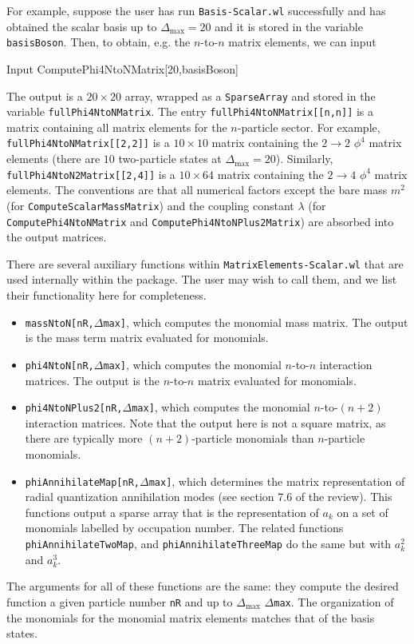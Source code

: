\documentclass[12pt]{article}
\newcommand\De\Delta
\newcommand{\ra}{\rightarrow}
\newcommand{\Dmax}{\De_{\max}}
\begin{document}
For example, suppose the user has run {\tt Basis-Scalar.wl} successfully and has obtained the scalar basis up to $\Delta_{\textrm{max}} = 20$ and it is stored in the variable {\tt basisBoson}. Then, to obtain, e.g. the $n$-to-$n$ matrix elements, we can input \begin{mmaCell}[moredefined={ComputePhi4NtoNMatrix,basisBoson}]{Input}
  ComputePhi4NtoNMatrix[20,basisBoson]
\end{mmaCell}
The output is a $20 \times 20$ array, wrapped as a {\tt SparseArray} and stored in the variable {\tt fullPhi4NtoNMatrix}. The entry {\tt fullPhi4NtoNMatrix[[n,n]]} is a matrix containing all matrix elements for the $n$-particle sector. For example, {\tt fullPhi4NtoNMatrix[[2,2]]} is a $10 \times 10$ matrix containing the $2 \ra 2$ $\phi^4$ matrix elements (there are $10$ two-particle states at $\Dmax=20$). Similarly, {\tt fullPhi4NtoN2Matrix[[2,4]]} is a $10 \times 64$ matrix containing the $2 \ra 4$ $\phi^4$ matrix elements.  The conventions are that all numerical factors except the bare mass $m^2$ (for {\tt ComputeScalarMassMatrix}) and the coupling constant $\lambda$ (for {\tt ComputePhi4NtoNMatrix} and {\tt ComputePhi4NtoNPlus2Matrix}) are absorbed into the output matrices. 


There are several auxiliary functions within {\tt MatrixElements-Scalar.wl} that are used internally within the package. The user may wish to call them, and we list their functionality here for completeness. \begin{itemize}
	\item {\tt massNtoN[nR,$\Delta$max]}, which computes the monomial mass matrix. The output is the mass term matrix evaluated for monomials.
  \item {\tt phi4NtoN[nR,$\Delta$max]}, which computes the monomial $n$-to-$n$ interaction matrices. The output is the $n$-to-$n$ matrix evaluated for monomials. 
  \item {\tt phi4NtoNPlus2[nR,$\Delta$max]}, which computes the monomial $n$-to-$(n+2)$ interaction matrices. Note that the output here is not a square matrix, as there are typically more $(n+2)$-particle monomials than $n$-particle monomials.
  \item {\tt phiAnnihilateMap[nR,$\Delta$max]}, which determines the matrix representation of radial quantization annihilation modes (see section 7.6 of the review). This functions output a sparse array that is the representation of $a_k$ on a set of monomials labelled by occupation number. The related functions {\tt phiAnnihilateTwoMap}, and {\tt phiAnnihilateThreeMap} do the same but with $a_k^2$ and $a_k^3$.
\end{itemize} The arguments for all of these functions are the same: they compute the desired function a given particle number {\tt nR} and up to $\Delta_{\textrm{max}}$ {\tt $\Delta$max}. The organization of the monomials for the monomial matrix elements matches that of the basis states.
\end{document}
